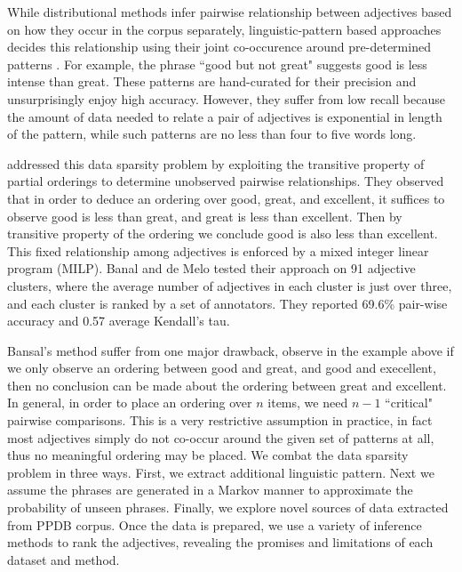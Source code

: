 While distributional methods infer pairwise relationship between adjectives based on how they occur in the corpus separately, linguistic-pattern based approaches decides this relationship using their joint co-occurence around pre-determined patterns \cite{sheinman2009adjscales,schulam2010automatically,sheinman2012refining} . For example, the phrase ``good but not great" suggests good is less intense than great. These patterns are hand-curated for their precision and unsurprisingly enjoy high accuracy. However, they suffer from low recall because the amount of data needed to relate a pair of adjectives is exponential in length of the pattern, while such patterns are no less than four to five words long.

 addressed this data sparsity problem by exploiting the transitive property of partial orderings to determine unobserved pairwise relationships. They observed that in order to deduce an ordering over good, great, and excellent, it suffices to observe good is less than great, and great is less than excellent. Then by transitive property of the ordering we conclude good is also less than excellent. This fixed relationship among adjectives is enforced by a mixed integer linear program (MILP). Banal and de Melo tested their approach on 91 adjective clusters, where the average number of adjectives in each cluster is just over three, and each cluster is ranked by a set of annotators. They reported 69.6\% pair-wise accuracy and 0.57 average Kendall's tau. 

Bansal's method suffer from one major drawback, observe in the example above if we only observe an ordering between good and great, and good and execellent, then no conclusion can be made about the ordering between great and excellent. In general, in order to place an ordering over $n$ items, we need $n - 1$ ``critical" pairwise comparisons. This is a very restrictive assumption in practice, in fact most adjectives simply do not co-occur around the given set of patterns at all, thus no meaningful ordering may be placed. We combat the data sparsity problem in three ways. First, we extract additional linguistic pattern. Next we assume the phrases are generated in a Markov manner to approximate the probability of unseen phrases. Finally, we explore novel sources of data extracted from PPDB corpus. Once the data is prepared, we use a variety of inference methods to rank the adjectives, revealing the promises and limitations of each dataset and method.
